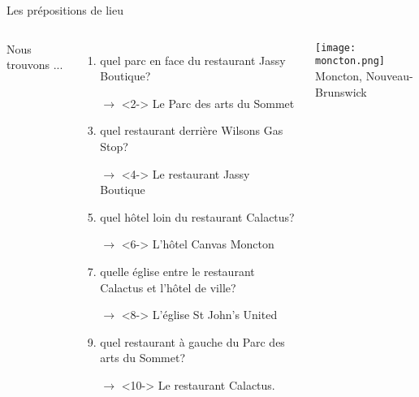 \begin{frame}{Les prépositions de lieu}
  \begin{columns}
      {\scriptsize
      Nous trouvons ...
      \begin{enumerate}
        \item quel parc en face du restaurant Jassy Boutique?
        \item[$\to$]<2-> Le Parc des arts du Sommet
        \item<3-> quel restaurant derrière Wilsons Gas Stop?
        \item[$\to$]<4-> Le restaurant Jassy Boutique
        \item<5-> quel hôtel loin du restaurant Calactus?
        \item[$\to$]<6-> L'hôtel Canvas Moncton
        \item<7-> quelle église entre le restaurant Calactus et l'hôtel de ville?
        \item[$\to$]<8-> L'église St John's United
        \item<9-> quel restaurant à gauche du Parc des arts du Sommet?
        \item[$\to$]<10-> Le restaurant Calactus.
      \end{enumerate}
      }
      \begin{minipage}[c][0.6\textheight]{\linewidth}
        \begin{center}
          \texttt{[image: moncton.png]} \\
          Moncton, Nouveau-Brunswick
        \end{center}
      \end{minipage}
  \end{columns}
\end{frame}